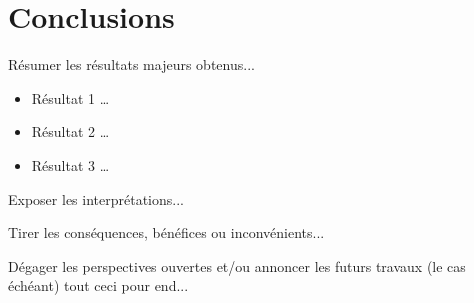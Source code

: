 \chapter*{Conclusions}

Résumer les résultats majeurs obtenus...

\begin{itemize}
	\item Résultat 1 \ldots
	\item Résultat 2 \ldots
	\item Résultat 3 \ldots
\end{itemize}

Exposer les interprétations...

Tirer les conséquences, bénéfices ou inconvénients...

Dégager les perspectives ouvertes et/ou annoncer les futurs travaux (le cas échéant) tout ceci pour \acrshort{end}...

